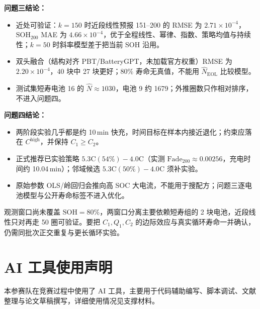 \documentclass[a4paper,12pt,UTF8,zihao=-4]{ctexart}
\begin{document}
\begin{resultbox}
\textbf{问题三结论：}
\begin{itemize}
  \item 近处可验证：\(k=150\) 时近段线性预报 151--200 的 RMSE 为 \(2.71\times 10^{-4}\)，\(\mathrm{SOH}_{200}\) MAE 为 \(4.66\times 10^{-4}\)，优于全程线性、幂律、指数、策略均值与持续性；\(k=50\) 时斜率模型差于把当前 SOH 沿用。
  \item 双头融合（结构对齐 PBT/BatteryGPT，未加载官方权重）RMSE 为 \(2.20\times 10^{-4}\)，40 块中 27 块更好；80\% 寿命无真值，不能用 \(\hat N_{\mathrm{EOL}}\) 比较模型。
  \item 测试集短寿电池 16 的 \(\hat N\approx 1030\)，电池 9 约 1679；外推圈数只作相对排序，不进入问题四。
\end{itemize}
\end{resultbox}

\begin{resultbox}
\textbf{问题四结论：}
\begin{itemize}
  \item 两阶段实验几乎都是约 10\,min 快充，时间目标在样本内接近退化；约束应落在 \(C^{\mathrm{high}}\)，并保持 \(C_1\ge C_2\)。
  \item 正式推荐已实验策略 \(5.3\mathrm{C}(54\%)-4.0\mathrm{C}\)（实测 \(\mathrm{Fade}_{200}\approx 0.00256\)，充电时间约 10.04\,min）；邻域候选 \(5.3\mathrm{C}(50\%)-4.0\mathrm{C}\) 须补实验。
  \item 原始参数 OLS/岭回归会推向高 SOC 大电流，不能用于搜配方；问题三逐电池模型与公开寿命标签不进入优化。
\end{itemize}
\end{resultbox}

观测窗口尚未覆盖 \(\mathrm{SOH}=80\%\)，两窗口分离主要依赖短寿组的 2 块电池，近段线性只对再走 50 圈可验证。要把 \(C_1,Q_1,C_2\) 的边际效应与真实循环寿命一并确认，仍需同批次正交重复与更长循环实验。

\section{AI 工具使用声明}

本参赛队在竞赛过程中使用了 AI 工具，主要用于代码辅助编写、脚本调试、文献整理与论文草稿撰写，详细使用情况见支撑材料。

\section*{ }



\appendix



\end{document}
